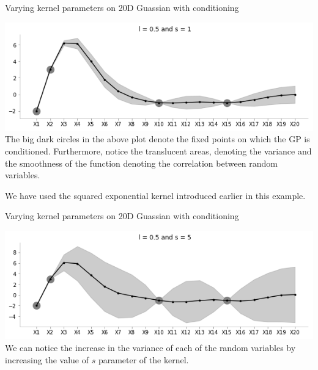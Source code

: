 \documentclass{beamer}
\begin{document}
	\begin{frame}{Varying kernel parameters on 20D Guassian with conditioning}
		\begin{center}
			\includegraphics[width=\linewidth, height=\textheight -120pt ,keepaspectratio]{gp/kernel/20gp_ker1}\\
			The big dark circles in the above plot denote the fixed points on which the GP is conditioned. Furthermore, notice the translucent areas, denoting the variance and the smoothness of the function denoting the correlation between random variables.
			
			We have used the squared exponential kernel introduced earlier in this example.
		\end{center}
	\end{frame}
	
	\begin{frame}{Varying kernel parameters on 20D Guassian with conditioning}
		\begin{center}
			\includegraphics[width=\linewidth, height=\textheight -120pt ,keepaspectratio]{gp/kernel/20gp_ker2}\\
			We can notice the increase in the variance of each of the random variables by increasing the value of $s$ parameter of the kernel.
		\end{center}
	\end{frame}
	
\end{document}
